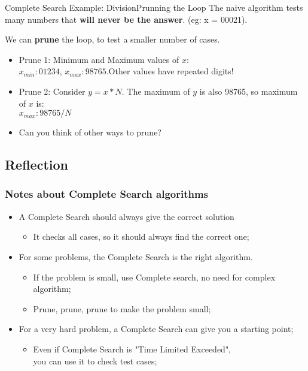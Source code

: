\begin{frame}{Complete Search Example: Division}{Prunning the Loop}
  The naive algorithm tests many numbers that {\bf will never be the answer}. (eg: x = 00021).\bigskip

  We can {\bf prune} the loop, to test a smaller number of cases.\bigskip

  \begin{itemize}
  \item Prune 1: Minimum and Maximum values of $x$:\\
    \hspace{1cm} $x_{min}: 01234$, $x_{max}: 98765$.\hfill Other values have repeated digits!
    \bigskip

  \item Prune 2: Consider $y = x * N$. The maximum of $y$ is also 98765, so maximum of $x$ is:\\
    \hspace{1cm} $x_{max}: 98765 / N$
    \bigskip

  \item Can you think of other ways to prune?
  \end{itemize}
\end{frame}

\subsection{Reflection}
\begin{frame}
  \frametitle{Notes about Complete Search algorithms}
  \begin{itemize}
  \item A Complete Search should always give the correct solution\\
    \begin{itemize}
    \item It checks all cases, so it should always find the correct one;
    \end{itemize}

    \bigskip

  \item For some problems, the Complete Search is the right algorithm.
    \begin{itemize}
    \item If the problem is small, use Complete search, no need for complex algorithm;
    \item Prune, prune, prune to make the problem small;
    \end{itemize}

    \bigskip

  \item For a very hard problem, a Complete Search can give you a starting point;
    \begin{itemize}
    \item Even if Complete Search is "Time Limited Exceeded",\\
    you can use it to check test cases;
    \end{itemize}
  \end{itemize}
\end{frame}

